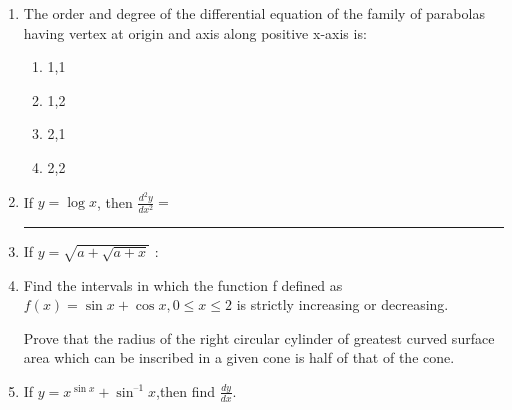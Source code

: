 \begin{enumerate}

\item The order and degree of the differential equation of the family of parabolas having vertex at origin and axis along positive x-axis is:


\begin{enumerate}
\item 1,1
\item 1,2
\item 2,1
\item 2,2
\end{enumerate}

\item If $y = \log x$, then $\frac{d^2y}{dx^2}=$ \rule{30pt}{1pt}

\item If $y=\sqrt{a+\sqrt{a+x}}$ :

\item Find the intervals in which the function f defined as $f(x) = \sin x + \cos x, 0\le x \le 2$ is strictly increasing or decreasing.

Prove that the radius of the right circular cylinder of greatest curved surface area which can be inscribed in a given cone is half of that of the cone.
\item If $y=x^{\sin x}+\sin^{–1}x$,then find $\frac{dy}{dx}$.
\end{enumerate}

